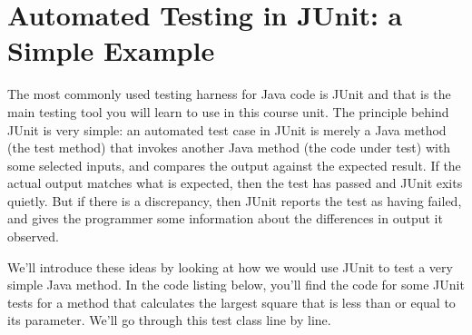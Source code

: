 \documentclass[
]{book}
\begin{document}
\hypertarget{simpleg}{%
\section{Automated Testing in JUnit: a Simple Example}\label{simpleg}}

The most commonly used testing harness for Java code is JUnit and that is the main testing tool you will learn to use in this course unit. The principle behind JUnit is very simple: an automated test case in JUnit is merely a Java method (the test method) that invokes another Java method (the code under test) with some selected inputs, and compares the output against the expected result. If the actual output matches what is expected, then the test has passed and JUnit exits quietly. But if there is a discrepancy, then JUnit reports the test as having failed, and gives the programmer some information about the differences in output it observed.

We'll introduce these ideas by looking at how we would use JUnit to test a very simple Java method. In the code listing below, you'll find the code for some JUnit tests for a method that calculates the largest square that is less than or equal to its parameter. We'll go through this test class line by line.
\end{document}
